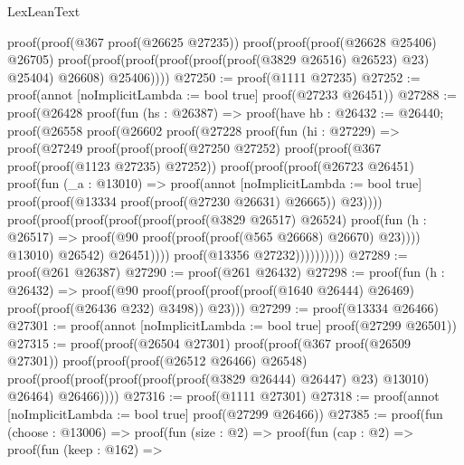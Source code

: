 \begin{lexlean}{LexLeanText}
\begin{coremodule}
      proof(proof(@367 proof(@26625 @27235))
          proof(proof(proof(@26628 @25406) @26705)
              proof(proof(proof(proof(proof(proof(@3829 @26516) @26523) @23) @25404) @26608)
                  @25406))))
@27250 := proof(@1111 @27235)
@27252 := proof(annot [noImplicitLambda := bool true] proof(@27233 @26451))
@27288 := proof(@26428
      proof(fun (hs : @26387) =>
        proof(have hb : @26432 := @26440;
          proof(@26558
              proof(@26602
                  proof(@27228
                      proof(fun (hi : @27229) =>
                        proof(@27249
                            proof(proof(proof(@27250 @27252)
                                  proof(proof(@367 proof(proof(@1123 @27235) @27252))
                                      proof(proof(proof(@26723 @26451)
                                            proof(fun (_a : @13010) =>
                                              proof(annot [noImplicitLambda := bool true]
                                                proof(proof(@13334
                                                      proof(proof(@27230 @26631) @26665))
                                                    @23))))
                                          proof(proof(proof(proof(proof(proof(@3829 @26517) @26524)
                                                    proof(fun (h : @26517) =>
                                                      proof(@90
                                                          proof(proof(proof(@565 @26668) @26670)
                                                              @23))))
                                                  @13010)
                                                @26542)
                                              @26451))))
                                proof(@13356 @27232))))))))))
@27289 := proof(@261 @26387)
@27290 := proof(@261 @26432)
@27298 := proof(fun (h : @26432) =>
    proof(@90 proof(proof(proof(proof(@1640 @26444) @26469) proof(proof(@26436 @232) @3498)) @23)))
@27299 := proof(@13334 @26466)
@27301 := proof(annot [noImplicitLambda := bool true] proof(@27299 @26501))
@27315 := proof(proof(@26504 @27301)
      proof(proof(@367 proof(@26509 @27301))
          proof(proof(proof(@26512 @26466) @26548)
              proof(proof(proof(proof(proof(proof(@3829 @26444) @26447) @23) @13010) @26464)
                  @26466))))
@27316 := proof(@1111 @27301)
@27318 := proof(annot [noImplicitLambda := bool true] proof(@27299 @26466))
@27385 := proof(fun (choose : @13006) =>
    proof(fun (size : @2) =>
      proof(fun (cap : @2) =>
        proof(fun (keep : @162) =>

\end{coremodule}
\end{lexlean}

